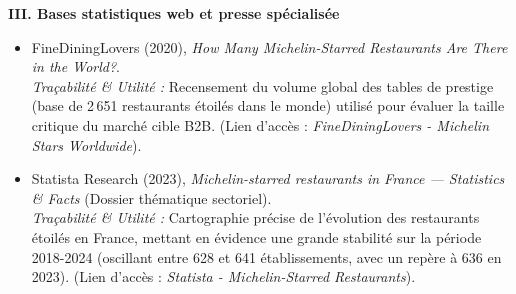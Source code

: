 \documentclass[11pt,a4paper]{article}
\begin{document}
\vspace{0.8em}
\textbf{III. Bases statistiques web et presse spécialisée}
\begin{itemize}
  \item FineDiningLovers (2020), \textit{How Many Michelin-Starred Restaurants Are There in the World?}. \\
  \textit{Traçabilité \& Utilité :} Recensement du volume global des tables de prestige (base de 2\,651 restaurants étoilés dans le monde) utilisé pour évaluer la taille critique du marché cible B2B. (Lien d'accès : \textit{FineDiningLovers - Michelin Stars Worldwide}).
  
  \item Statista Research (2023), \textit{Michelin-starred restaurants in France — Statistics \& Facts} (Dossier thématique sectoriel). \\
  \textit{Traçabilité \& Utilité :} Cartographie précise de l'évolution des restaurants étoilés en France, mettant en évidence une grande stabilité sur la période 2018-2024 (oscillant entre 628 et 641 établissements, avec un repère à 636 en 2023). (Lien d'accès : \textit{Statista - Michelin-Starred Restaurants}).
\end{itemize}
\end{document}
